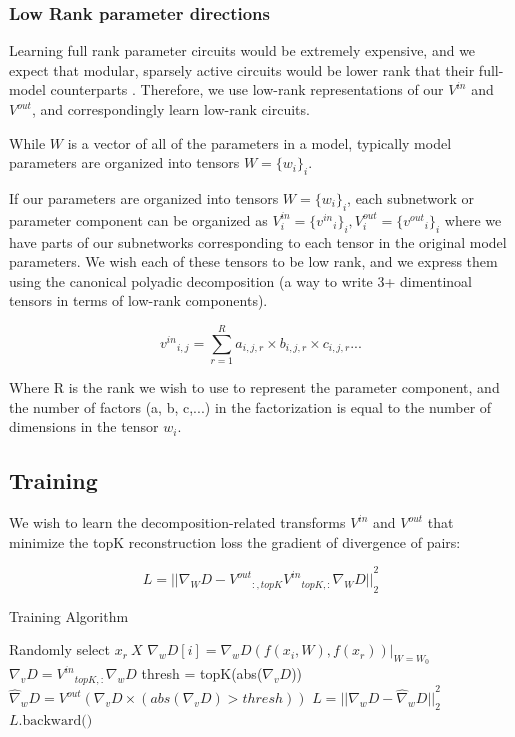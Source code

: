 \documentclass{article}
\theoremstyle{plain}
\theoremstyle{definition}
\theoremstyle{remark}
\begin{document}
\subsubsection{Low Rank parameter directions}
Learning full rank parameter circuits would be extremely expensive, and we expect that modular, sparsely active circuits would be lower rank that their full-model counterparts \cite{}. Therefore, we use low-rank representations of our $V^{in}$ and $V^{out}$, and correspondingly learn low-rank circuits. 

While $W$ is a vector of all of the parameters in a model, typically model parameters are organized into tensors $W=\{w_i\}_i$. 

If our parameters are organized into tensors $W=\{w_i\}_i$, each subnetwork or parameter component can be organized as $V^{in}_i  = {\{{v^{in}}_i\}}_i, V^{out}_i = {\{{v^{out}}_i\}}_i$ where we have parts of our subnetworks corresponding to each tensor in the original model parameters. We wish each of these tensors to be low rank, and we express them using the canonical polyadic decomposition \cite{} (a way to write 3+ dimentinoal tensors in terms of low-rank components).

\begin{equation}
{v^{in}}_{i,j} = \sum_{r=1}^{R} a_{i,j,r} \times b_{i,j,r} \times c_{i,j,r} ...
\end{equation}

Where R is the rank we wish to use to represent the parameter component, and the number of factors (a, b, c,...) in the factorization is equal to the number of dimensions in the tensor $w_i$.


\subsection{Training}
We wish to learn the decomposition-related transforms $V^{in}$ and $V^{out}$ that minimize the topK reconstruction loss the gradient of divergence of pairs: 

\begin{equation}
    L = {|| \nabla_W D - {V^{out}}_{:, topK} {V^{in}}_{topK,:} \nabla_W D ||}_2^2
\end{equation}

\begin{algorithm}
\caption{Training Algorithm}
\begin{algorithmic}[1]
            \STATE Randomly select $x_r ~ X$
            \STATE $\nabla_w D[i] = \nabla_w D(f(x_i, W), f(x_r))|_{W=W_0}$
        \ENDFOR
        \STATE $\nabla_v D = {V^{in}}_{topK,:} \nabla_w D$
        \STATE thresh = topK(abs($\nabla_v D$))
        \STATE $\hat{\nabla}_w D = {V^{out}} (\nabla_v D \times (abs(\nabla_v D) > thresh))$
        \STATE $L = {|| \nabla_w D - \hat{\nabla}_w D ||}_2^2$
        \STATE $L.\text{backward()}$
    \ENDFOR
\ENDFOR
\end{algorithmic}
\end{algorithm}
\end{document}

